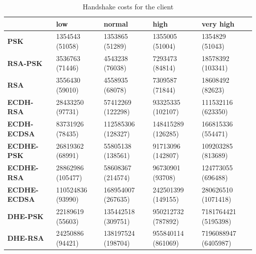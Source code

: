 \documentclass{llncs}
\begin{document}
\begin{table}[]
  \begin{tabular}{|l|l|l|l|l|}
  \hline
                       & \textbf{low}      & \textbf{normal}    & \textbf{high}      & \textbf{very high}   \\ \hline
  \textbf{PSK}         & 1354543 (51058)   & 1353865 (51289)    & 1355005 (51004)    & 1354829 (51043)      \\ \hline
  \textbf{RSA-PSK}     & 3536763 (71446)   & 4543238 (76038)    & 7293473 (84814)    & 18578392 (103341)    \\ \hline
  \textbf{RSA}         & 3556430 (59010)   & 4558935 (68078)    & 7309587 (71844)    & 18608492 (82623)     \\ \hline
  \textbf{ECDH-RSA}    & 28433250 (97731)  & 57412269 (122298)  & 93325335 (102107)  & 111532116 (623350)   \\ \hline
  \textbf{ECDH-ECDSA}  & 83731926 (78435)  & 112585306 (128327) & 148415289 (126285) & 166815336 (554471)   \\ \hline
  \textbf{ECDHE-PSK}   & 26819362 (68991)  & 55805138 (138561)  & 91713096 (142807)  & 109203285 (813689)   \\ \hline
  \textbf{ECDHE-RSA}   & 28862986 (105477) & 58608367 (214574)  & 96730901 (93708)   & 124773055 (696488)   \\ \hline
  \textbf{ECDHE-ECDSA} & 110524836 (93990) & 168954007 (267635) & 242501399 (149155) & 280626510 (1071418)  \\ \hline
  \textbf{DHE-PSK}     & 22189619 (55603)  & 135442518 (309751) & 950212732 (787892) & 7181764421 (5195398) \\ \hline
  \textbf{DHE-RSA}     & 24250886 (94421)  & 138197524 (198704) & 955840114 (861069) & 7196088947 (6405987) \\ \hline
  \end{tabular}
  \centering \caption{\label{table:client-hs-cost-all-sls} Handshake costs for the client}
  \end{table}
\end{document}
